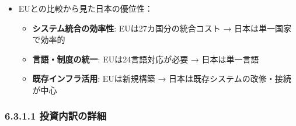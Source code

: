 \documentclass[
  a4paper,
  a4paper,
  11pt]{ltjsbook}
\providecommand{\tightlist}{%
  \setlength{\itemsep}{0pt}\setlength{\parskip}{0pt}}
\begin{document}
\begin{enumerate}
\begin{itemize}
    \begin{itemize}
    \tightlist
    \item
      EUは27カ国の異なるシステムを統合する必要があるのに対し、日本は単一国家
    \item
      日本は既にNDB（レセプトDB）、介護DB、DPCデータベース等の全国規模データベースが稼働中
    \item
      電子カルテ普及率は病院で91.2\%、診療所で49.9\%（2020年）{[}107{]}
    \item
      マイナンバーカードを活用した医療情報連携基盤が整備途上
    \end{itemize}
  \item
    EUとの比較から見た日本の優位性：

    \begin{itemize}
    \tightlist
    \item
      \textbf{システム統合の効率性}: EUは27カ国分の統合コスト →
      日本は単一国家で効率的
    \item
      \textbf{言語・制度の統一}: EUは24言語対応が必要 → 日本は単一言語
    \item
      \textbf{既存インフラ活用}: EUは新規構築 →
      日本は既存システムの改修・接続が中心
    \end{itemize}
  \end{itemize}
\end{enumerate}

\subsubsection{6.3.1.1
投資内訳の詳細}\label{ux6295ux8cc7ux5185ux8a33ux306eux8a73ux7d30}
\end{document}
